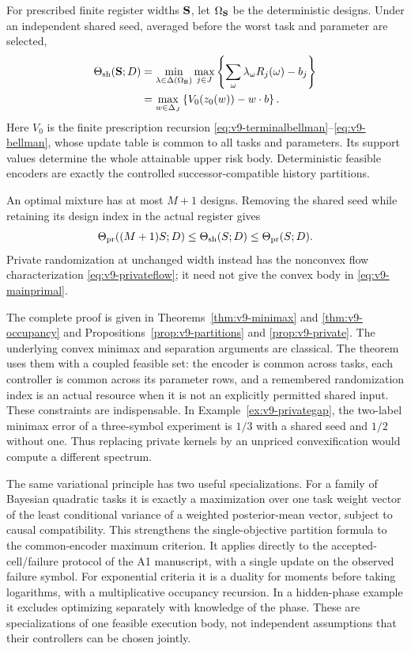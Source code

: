 \begin{theorem}
\label{thm:v9-main}
For prescribed finite register widths ${\bf S}$, let
$\Omega_{\bf S}$ be the deterministic designs. Under an independent
shared seed, averaged before the worst task and parameter are selected,
\begin{align}
 \Theta_{\rm sh}({\bf S};D)
 &=\min_{\lambda\in\Delta(\Omega_{\bf S})}
       \max_{j\in J}\left\{\sum_\omega\lambda_\omega
                                            R_j(\omega)-b_j\right\}
                                                        \label{eq:v9-mainprimal}\\
 &=\max_{w\in\Delta_J}\left\{
           V_0(z_0(w))-w\cdot b\right\}.              \label{eq:v9-maindual}
\end{align}
Here $V_0$ is the finite prescription recursion
\eqref{eq:v9-terminalbellman}--\eqref{eq:v9-bellman}, whose update table
is common to all tasks and parameters. Its support values determine the
whole attainable upper risk body. Deterministic feasible encoders are
exactly the controlled successor-compatible history partitions.

An optimal mixture has at most $M+1$ designs. Removing the shared seed
while retaining its design index in the actual register gives
\[
 \Theta_{\rm pr}((M+1)S;D)
       \le\Theta_{\rm sh}(S;D)\le\Theta_{\rm pr}(S;D).
\]
Private randomization at unchanged width instead has the nonconvex flow
characterization \eqref{eq:v9-privateflow}; it need not give the convex
body in \eqref{eq:v9-mainprimal}.
\end{theorem}

The complete proof is given in Theorems~\ref{thm:v9-minimax} and
\ref{thm:v9-occupancy} and Propositions~\ref{prop:v9-partitions} and
\ref{prop:v9-private}. The underlying convex minimax and separation
arguments are classical. The theorem uses them with a coupled feasible
set: the encoder is common across tasks, each controller is common
across its parameter rows, and a remembered randomization index is an
actual resource when it is not an explicitly permitted shared input.
These constraints are indispensable. In Example~\ref{ex:v9-privategap},
the two-label minimax error of a three-symbol experiment is $1/3$ with a
shared seed and $1/2$ without one. Thus replacing private kernels by an
unpriced convexification would compute a different spectrum.

The same variational principle has two useful specializations. For a
family of Bayesian quadratic tasks it is exactly a maximization over
one task weight vector of the least conditional variance of a weighted
posterior-mean vector, subject to causal compatibility. This strengthens
the single-objective partition formula to the common-encoder maximum
criterion. It applies directly to the accepted-cell/failure protocol
of the A1 manuscript, with a single update on the observed failure
symbol. For exponential criteria it is a duality for moments before
taking logarithms, with a multiplicative occupancy recursion. In a
hidden-phase example it excludes optimizing separately with knowledge
of the phase. These are specializations of one feasible execution body,
not independent assumptions that their controllers can be chosen jointly.

